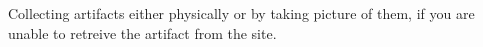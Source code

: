 \begin{method} \label{meth:artifact_collection} 
  Collecting artifacts either physically or by taking picture of them, if you are unable to retreive the artifact from the site.
\end{method}